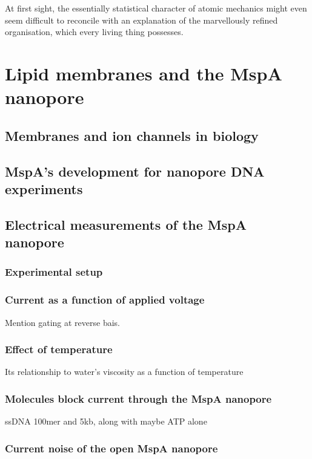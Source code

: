 \begin{savequote}[75mm]
At first sight, the essentially statistical character of atomic mechanics might even seem difficult to reconcile with an explanation of the marvellously refined organisation, which every living thing possesses.
\end{savequote}

\chapter{Lipid membranes and the MspA nanopore}
\label{2_lipids_mspa}

\section{Membranes and ion channels in biology}

\section{MspA's development for nanopore DNA experiments}

\section{Electrical measurements of the MspA nanopore}

\subsection{Experimental setup}

\subsection{Current as a function of applied voltage}

Mention gating at reverse bais.

\subsection{Effect of temperature}

Its relationship to water's viscosity as a function of temperature

\subsection{Molecules block current through the MspA nanopore}

ssDNA 100mer and 5kb, along with maybe ATP alone

\subsection{Current noise of the open MspA nanopore}